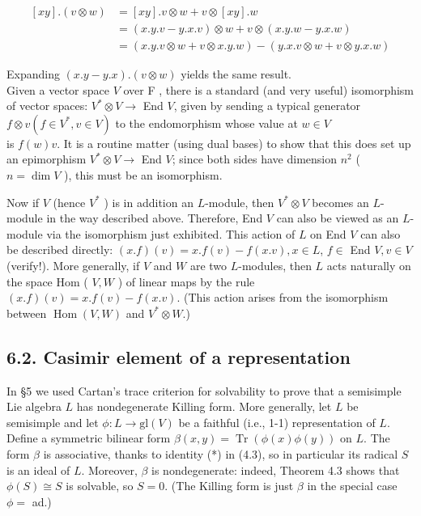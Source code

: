 \documentclass[10pt]{article}
\begin{document}
$$
\begin{aligned}
{[x y] .(v \otimes w) } & =[x y] . v \otimes w+v \otimes[x y] . w \\
& =(x . y . v-y . x . v) \otimes w+v \otimes(x . y . w-y . x . w) \\
& =(x . y . v \otimes w+v \otimes x . y . w)-(y . x . v \otimes w+v \otimes y . x . w)
\end{aligned}
$$

Expanding $(x . y-y . x) .(v \otimes w)$ yields the same result.\\
Given a vector space $V$ over F , there is a standard (and very useful) isomorphism of vector spaces: $V^{*} \otimes V \rightarrow$ End $V$, given by sending a typical generator $f \otimes v\left(f \in V^{*}, v \in V\right)$ to the endomorphism whose value at $w \in V$\\
is $f(w) v$. It is a routine matter (using dual bases) to show that this does set up an epimorphism $V^{*} \otimes V \rightarrow$ End $V$; since both sides have dimension $n^{2}$ ( $n=\operatorname{dim} V$ ), this must be an isomorphism.

Now if $V$ (hence $V^{*}$ ) is in addition an $L$-module, then $V^{*} \otimes V$ becomes an $L$-module in the way described above. Therefore, End $V$ can also be viewed as an $L$-module via the isomorphism just exhibited. This action of $L$ on End $V$ can also be described directly: $(x . f)(v)=x . f(v)-f(x . v), x \in L$, $f \in$ End $V, v \in V$ (verify!). More generally, if $V$ and $W$ are two $L$-modules, then $L$ acts naturally on the space Hom ( $V, W$ ) of linear maps by the rule $(x . f)(v)=x . f(v)-f(x . v)$. (This action arises from the isomorphism between $\operatorname{Hom}(V, W)$ and $V^{*} \otimes W$.)

\subsection*{6.2. Casimir element of a representation}
In §5 we used Cartan's trace criterion for solvability to prove that a semisimple Lie algebra $L$ has nondegenerate Killing form. More generally, let $L$ be semisimple and let $\phi: L \rightarrow \mathrm{gl}(V)$ be a faithful (i.e., 1-1) representation of $L$. Define a symmetric bilinear form $\beta(x, y)=\operatorname{Tr}(\phi(x) \phi(y))$ on $L$. The form $\beta$ is associative, thanks to identity (*) in (4.3), so in particular its radical $S$ is an ideal of $L$. Moreover, $\beta$ is nondegenerate: indeed, Theorem 4.3 shows that $\phi(S) \cong S$ is solvable, so $S=0$. (The Killing form is just $\beta$ in the special case $\phi=$ ad.)
\end{document}
